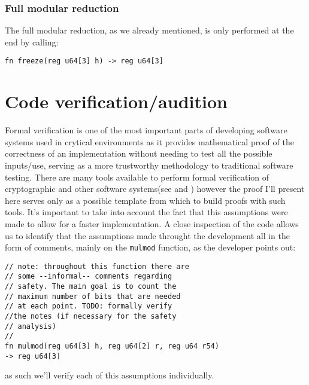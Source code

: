 \documentclass{article}
\begin{document}
\subsubsection{Full modular reduction}
The full modular reduction, as we already mentioned, is only performed at the end by calling:
\begin{Verbatim}[fontsize=\footnotesize]
fn freeze(reg u64[3] h) -> reg u64[3]
\end{Verbatim}


\section{Code verification/audition}
Formal verification is one of the most important parts of developing software systems used in crytical environments as it provides mathematical proof of the
correctness of an implementation without needing to test all the possible inputs/use, serving as a more trustworthy methodology to traditional software 
testing. There are many tools available to perform formal verification of cryptographic and other software systems(see \cite{coq_proof} and \cite{easycrypt}) 
however the proof I'll present here serves only as a possible template from which to build proofs with such tools.
It's important to take into account the fact that this assumptions were made to allow for a faster implementation.
A close inspection of the code allows us to identify that the assumptions made throught the development all in the form of comments, mainly on the
\texttt{mulmod} function, as the developer points out:

\begin{Verbatim}[fontsize=\footnotesize]
// note: throughout this function there are 
// some --informal-- comments regarding
// safety. The main goal is to count the 
// maximum number of bits that are needed
// at each point. TODO: formally verify 
//the notes (if necessary for the safety
// analysis)
//
fn mulmod(reg u64[3] h, reg u64[2] r, reg u64 r54) 
-> reg u64[3]
\end{Verbatim}

as such we'll verify each of this assumptions individually.
\end{document}
